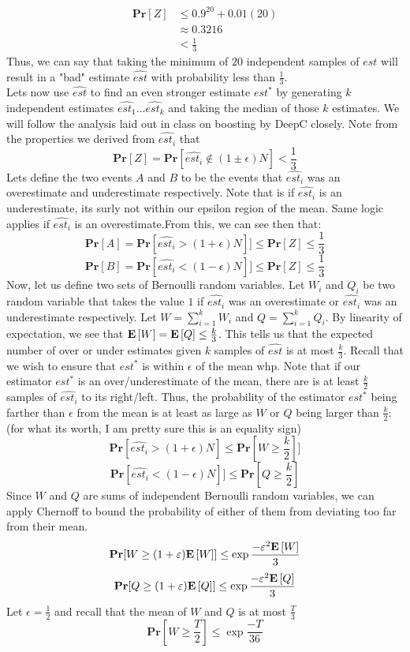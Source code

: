 \documentclass[12pt]{article}
\begin{document}
\begin{solution}
\begin{align*}
    \textbf{Pr}[Z] &\leq 0.9^{20} + 0.01(20) \\
    &\approx 0.3216 \\
    &< \frac{1}{3}
\end{align*}
Thus, we can say that taking the minimum of $20$ independent samples of $est$ will result in a "bad" estimate $\hat{est}$ with probability less than $\frac{1}{3}$. \\
Lets now use $\hat{est}$ to find an even stronger estimate $est^*$ by generating $k$ independent estimates $\hat{est_1} \dots \hat{est_k}$ and taking the median of those $k$ estimates. We will follow the analysis laid out in class on boosting by DeepC closely. Note from the properties we derived from $\hat{est_i}$ that 
\[
\textbf{Pr}[Z] = \textbf{Pr}[\hat{est_i} \notin (1 \pm \epsilon) N] < \frac{1}{3}
\]
Lets define the two events $A$ and $B$ to be the events that $\hat{est_i}$ was an overestimate and underestimate respectively. Note that is if $\hat{est_i}$ is an underestimate, its surly not within our epsilon region of the mean. Same logic applies if $\hat{est_i}$ is an overestimate.From this, we can see then that:
\[
\textbf{Pr}[A] =\textbf{Pr}[\hat{est_i} > (1 + \epsilon) N]] \leq \textbf{Pr}[Z] \leq \frac{1}{3}
\]
\[
\textbf{Pr}[B] = \textbf{Pr}[\hat{est_i} < (1 - \epsilon) N]] \leq \textbf{Pr}[Z] \leq \frac{1}{3}
\]
Now, let us define two sets of Bernoulli random variables. Let $W_i$ and $Q_i$ be two random variable that takes the value $1$ if $\hat{est_i}$ was an overestimate or $\hat{est_i}$ was an underestimate respectively. Let $W = \sum_{i=1}^k{W_i}$ and $Q = \sum_{i=1}^k{Q_i}$. By linearity of expectation, we see that $\mathbf{E}\left[W\right] = \mathbf{E}\left[Q\right] \leq \frac{k}{3}$. This tells us that the expected number of over or under estimates given $k$ samples of $\hat{est}$ is at most $\frac{k}{3}$. Recall that we wish to ensure that $est^*$ is within $\epsilon$ of the mean whp. Note that if our estimator $est^*$ is an over/underestimate of the mean, there are is at least $\frac{k}{2}$ samples of $\hat{est_i}$ to its right/left. Thus, the probability of the estimator $est^*$ being farther than $\epsilon$ from the mean is at least as large as $W$ or $Q$ being larger than $\frac{k}{2}$: (for what its worth, I am pretty sure this is an equality sign)
\[
 \textbf{Pr}[\hat{est_i} > (1 + \epsilon) N] \leq \textbf{Pr}[W \geq \frac{k}{2}]]
\]
\[
\textbf{Pr}[\hat{est_i} < (1 - \epsilon) N]]  \leq \textbf{Pr}[Q \geq \frac{k}{2}] 
\]
Since $W$ and $Q$ are sums of independent Bernoulli random variables, we can apply Chernoff to bound the probability of either of them from deviating too far from their mean. 
\[
\textbf{Pr}[W \geq (1 + \varepsilon)\mathbf{E}\left[W\right]] \leq \exp{\frac{-\varepsilon^2\mathbf{E}\left[W\right]}{3}}
\]
\[
\textbf{Pr}[Q \geq (1 + \varepsilon)\mathbf{E}\left[Q\right]] \leq \exp{\frac{-\varepsilon^2\mathbf{E}\left[Q\right]}{3}}
\]
Let $\epsilon=\frac{1}{2}$ and recall that the mean of $W$ and $Q$ is at most $\frac{T}{3}$
\[
\textbf{Pr}[W \geq \frac{T}{2}] \leq \exp{\frac{-T}{36}}
\]


\end{solution}
\end{document}
